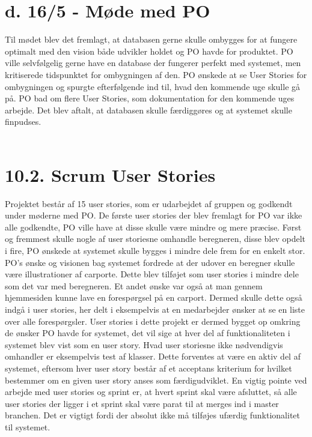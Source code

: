 \documentclass[11pt]{report}
\begin{document}
\section*{d. 16/5 - Møde med PO}
Til mødet blev det fremlagt, at databasen gerne skulle ombygges for at
fungere optimalt med den vision både udvikler holdet og PO havde for
produktet. PO ville selvfølgelig gerne have en database der fungerer
perfekt med systemet, men kritiserede tidspunktet for ombygningen af
den. PO ønskede at se User Stories for ombygningen og spurgte
efterfølgende ind til, hvad den kommende uge skulle gå på. PO bad om
flere User Stories, som dokumentation for den kommende uges
arbejde. Det blev aftalt, at databasen skulle færdiggøres og at
systemet skulle finpudses. \\\\

\section*{10.2. Scrum User Stories}
Projektet består af 15 user stories, som er udarbejdet af gruppen og godkendt under møderne med PO. De første user stories der blev fremlagt for PO var ikke alle godkendte, PO ville have at disse skulle være mindre og mere præcise.
Først og fremmest skulle nogle af user storiesne omhandle beregneren, disse blev opdelt i fire, PO ønskede at systemet skulle bygges i mindre dele frem for en enkelt stor. PO’s ønske og visionen bag systemet fordrede at der udover en beregner skulle være illustrationer af carporte. Dette blev tilføjet som user stories i mindre dele som det var med beregneren. Et andet ønske var også at man gennem hjemmesiden kunne lave en forespørgsel på en carport. Dermed skulle dette også indgå i user stories, her delt i eksempelvis at en medarbejder ønsker at se en liste over alle forespørgsler. User stories i dette projekt er dermed bygget op omkring de ønsker PO havde for systemet, det vil sige at hver del af funktionaliteten i systemet blev vist som en user story.
Hvad user storiesne ikke nødvendigvis omhandler er eksempelvis test af klasser. Dette forventes at være en aktiv del af systemet, eftersom hver user story består af et acceptans kriterium for hvilket bestemmer om en given user story anses som færdigudviklet. En vigtig pointe ved arbejde med user stories og sprint er, at hvert sprint skal være afsluttet, så alle user stories der ligger i et sprint skal være parat til at merges ind i master branchen. Det er vigtigt fordi der absolut ikke må tilføjes ufærdig funktionalitet til systemet.
\end{document}
